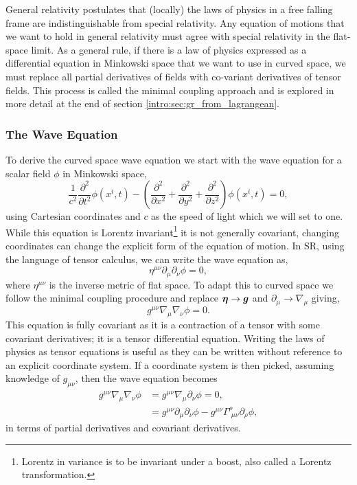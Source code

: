 General relativity postulates that (locally) the laws of physics in a free falling frame are indistinguishable from special relativity. Any equation of motions that we want to hold in general relativity must agree with special relativity in the flat-space limit. As a general rule, if there is a law of physics expressed as a differential equation in Minkowski space that we want to use in curved space, we must replace all partial derivatives of fields with co-variant derivatives of tensor fields. This process is called the minimal coupling approach and is explored in more detail at the end of section \ref{intro:sec:gr_from_lagrangean}.







\subsubsection{The Wave Equation}
To derive the curved space wave equation we start with the wave equation for a scalar field $\phi$ in Minkowski space, 
\begin{equation}
\frac{1}{c^2}\frac{\partial^2}{\partial t^2} \phi(x^i,t) - \left(\frac{\partial^2}{\partial x^2}+\frac{\partial^2}{\partial y^2}+\frac{\partial^2}{\partial z^2} \right)\phi(x^i,t)=0, \label{intro:eq:fullflatwave}
\end{equation}
using Cartesian coordinates and $c$ as the speed of light which we will set to one. While this equation is Lorentz invariant\footnote{Lorentz in variance is to be invariant under a boost, also called a Lorentz transformation.} it is not generally covariant, changing coordinates can change the explicit form of the equation of motion. In SR, using the language of tensor calculus, we can write the wave equation as, 
\begin{equation}
\eta^{\mu\nu}\partial_\mu\partial_\nu\phi=0\label{intro:eq:waveeqn},
\end{equation}
where $\eta^{\mu\nu}$ is the inverse metric of flat space. To adapt this to curved space we follow the minimal coupling procedure and replace $\boldsymbol{\eta} \rightarrow \boldsymbol{g}$ and $\partial_\mu \rightarrow \nabla_\mu$ giving,
\begin{equation} 
g^{\mu\nu}\nabla_\mu \nabla_\nu\phi =0. \label{intro:eq:grwave}
\end{equation}
This equation is fully covariant as it is a contraction of a tensor with some covariant derivatives; it is a tensor differential equation. Writing the laws of physics as tensor equations is useful as they can be written without reference to an explicit coordinate system. If a coordinate system is then picked, assuming knowledge of $g_{\mu\nu}$, then the wave equation becomes
\begin{align}
g^{\mu\nu}\nabla_\mu \nabla_\nu \phi &= g^{\mu\nu}\nabla_\mu \partial_\nu \phi =0,\\
&= g^{\mu\nu}\partial_\mu \partial_\nu \phi - g^{\mu\nu}\Gamma^\rho_{\,\,\mu\nu}\partial_\rho \phi,
\end{align}
in terms of partial derivatives and covariant derivatives. 

